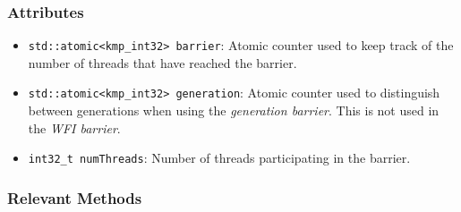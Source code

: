 \subsubsection{Attributes}
\begin{itemize}
	\item \texttt{std::atomic<kmp_int32> barrier}: Atomic counter used to keep track of the number of
	      threads that have reached the barrier.
	\item \texttt{std::atomic<kmp_int32> generation}: Atomic counter used to distinguish between
	      generations when using the \emph{generation barrier}. This is not used in the \emph{WFI
		      barrier}.
	\item \texttt{int32_t numThreads}: Number of threads participating in the barrier.
\end{itemize}

\subsubsection{Relevant Methods}

